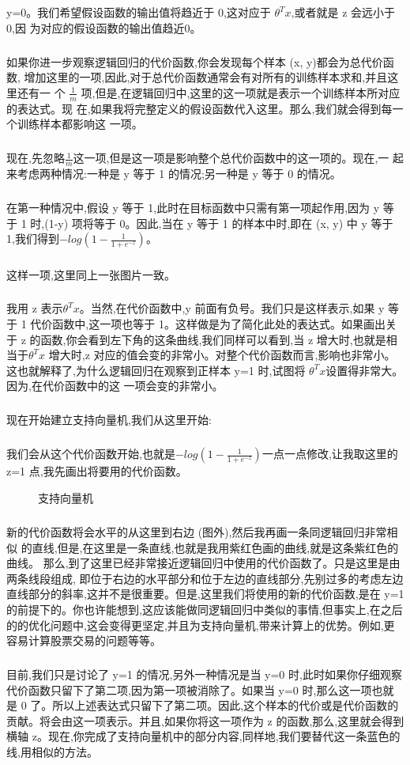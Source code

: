 \documentclass{article}
\begin{document}
\begin{CJK}{UTF8}{gbsn}
y=0。我们希望假设函数的输出值将趋近于 0,这对应于 $\theta^Tx$,或者就是 z 会远小于 0,因
为对应的假设函数的输出值趋近0。
\subparagraph{}
如果你进一步观察逻辑回归的代价函数,你会发现每个样本 (x, y)都会为总代价函数,
增加这里的一项,因此,对于总代价函数通常会有对所有的训练样本求和,并且这里还有一
个 $\frac{1}{m}$ 项,但是,在逻辑回归中,这里的这一项就是表示一个训练样本所对应的表达式。现
在,如果我将完整定义的假设函数代入这里。那么,我们就会得到每一个训练样本都影响这
一项。
\subparagraph{}
现在,先忽略$\frac{1}{m}$这一项,但是这一项是影响整个总代价函数中的这一项的。现在,一
起来考虑两种情况:一种是 y 等于 1 的情况;另一种是 y 等于 0 的情况。
\subparagraph{}
在第一种情况中,假设 y 等于 1,此时在目标函数中只需有第一项起作用,因为 y 等于 1 时,(1-y) 项将等于
0。因此,当在 y 等于 1 的样本中时,即在 (x, y) 中 y 等于 1,我们得到$-log(1-\frac{1}{{1+e^{-z}}})$。
\subparagraph{}
这样一项,这里同上一张图片一致。
\subparagraph{}
我用 z 表示$\theta^Tx$。当然,在代价函数中,y 前面有负号。我们只是这样表示,如果 y 等于 1 代价函数中,这一项也等于 1。这样做是为了简化此处的表达式。如果画出关于 z 的函数,你会看到左下角的这条曲线,我们同样可以看到,当 z 增大时,也就是相当于$\theta^Tx$ 增大时,z 对应的值会变的非常小。对整个代价函数而言,影响也非常小。这也就解释了,为什么逻辑回归在观察到正样本 y=1 时,试图将 $\theta^Tx$设置得非常大。因为,在代价函数中的这
一项会变的非常小。
\subparagraph{}
现在开始建立支持向量机,我们从这里开始:
\subparagraph{}
我们会从这个代价函数开始,也就是$-log(1-\frac{1}{{1+e^{-z}}})$一点一点修改,让我取这里的z=1 点,我先画出将要用的代价函数。
\begin{figure}[H]
\caption{支持向量机}
\label{fig:703}
\end{figure}
\subparagraph{}
新的代价函数将会水平的从这里到右边 (图外),然后我再画一条同逻辑回归非常相似
的直线,但是,在这里是一条直线,也就是我用紫红色画的曲线,就是这条紫红色的曲线。
那么,到了这里已经非常接近逻辑回归中使用的代价函数了。只是这里是由两条线段组成,
即位于右边的水平部分和位于左边的直线部分,先别过多的考虑左边直线部分的斜率,这并不是很重要。但是,这里我们将使用的新的代价函数,是在 y=1 的前提下的。你也许能想到,这应该能做同逻辑回归中类似的事情,但事实上,在之后的的优化问题中,这会变得更坚定,并且为支持向量机,带来计算上的优势。例如,更容易计算股票交易的问题等等。
\subparagraph{}
目前,我们只是讨论了 y=1 的情况,另外一种情况是当 y=0 时,此时如果你仔细观察
代价函数只留下了第二项,因为第一项被消除了。如果当 y=0 时,那么这一项也就是 0 了。所以上述表达式只留下了第二项。因此,这个样本的代价或是代价函数的贡献。将会由这一项表示。并且,如果你将这一项作为 z 的函数,那么,这里就会得到横轴 z。现在,你完成了支持向量机中的部分内容,同样地,我们要替代这一条蓝色的线,用相似的方法。

\end{CJK}
\end{document}
